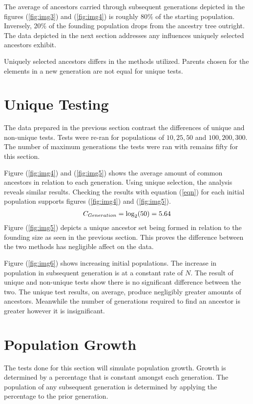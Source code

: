 \documentclass[12pt]{extarticle}
\begin{document}
The average of ancestors carried through subsequent generations depicted in the figures (\ref{fig:img3}) and (\ref{fig:img4}) is roughly 80$\%$ of the starting population. Inversely, 20$\%$ of the founding population drops from the ancestry tree outright. The data depicted in the next section addresses any influences uniquely selected ancestors exhibit.

Uniquely selected ancestors differs in the methods utilized. Parents chosen for the elements in a new generation are not equal for unique tests. 


\section{Unique Testing}


The data prepared in the previous section contrast the differences of unique and non-unique tests. Tests were re-ran for populations of $10, 25, 50$ and $100, 200, 300$. The number of maximum generations the tests were ran with remains fifty for this section.

\indent Figure (\ref{fig:img4}) and (\ref{fig:img5}) shows the average amount of common ancestors in relation to each generation. Using unique selection, the analysis reveals similar results. Checking the results with equation (\ref{eqn}) for each initial population supports figures (\ref{fig:img4}) and (\ref{fig:img5}).
\begin{align}
\notag
C_{Generation} = \log_2(50) = 5.64
\end{align}
\indent Figure (\ref{fig:img5}) depicts a unique ancestor set being formed in relation to the founding size as seen in the previous section. This proves the difference between the two methods has negligible affect on the data.

Figure (\ref{fig:img6}) shows increasing initial populations. The increase in population in subsequent generation is at a constant rate of $N$. The result of unique and non-unique tests show there is no significant difference between the two. The unique test results, on average, produce negligibly greater amounts of ancestors. Meanwhile the number of generations required to find an ancestor is greater however it is insignificant.

\section{Population Growth}

The tests done for this section will simulate population growth. Growth is determined by a percentage that is constant amongst each generation. The population of any subsequent generation is determined by applying the percentage to the prior generation.
\end{document}
